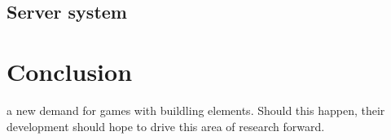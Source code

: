 \documentclass{scrartcl}
\begin{document}
\subsection{Server system}

\section{Conclusion}
a new demand for games with buildling elements. Should this happen, their development should hope to drive this area of research forward.

 

\end{document}

